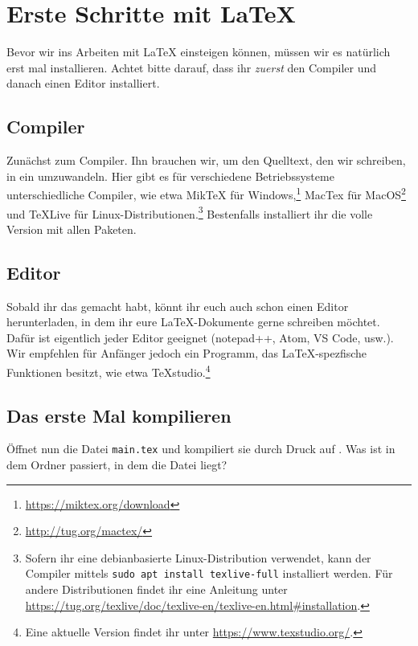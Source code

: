 \chapter*{Erste Schritte mit \LaTeX}
Bevor wir ins Arbeiten mit \LaTeX{} einsteigen können, müssen wir es natürlich erst mal installieren. Achtet bitte darauf, dass ihr \emph{zuerst} den Compiler und danach einen Editor installiert.

\section*{Compiler}
Zunächst zum Compiler. Ihn brauchen wir, um den Quelltext, den wir schreiben, in ein  umzuwandeln. Hier gibt es für verschiedene Betriebssysteme unterschiedliche Compiler, wie etwa MikTeX für Windows,\footnote{\url{https://miktex.org/download}} MacTex für MacOS\footnote{\url{http://tug.org/mactex/}} und TeXLive für Linux-Distributionen.\footnote{Sofern ihr eine debianbasierte Linux-Distribution verwendet, kann der Compiler mittels \texttt{sudo apt install texlive-full} installiert werden. Für andere Distributionen findet ihr eine Anleitung unter \url{https://tug.org/texlive/doc/texlive-en/texlive-en.html\#installation}.} Bestenfalls installiert ihr die volle Version mit allen Paketen.

\section*{Editor}
Sobald ihr das gemacht habt, könnt ihr euch auch schon einen Editor herunterladen, in dem ihr eure \LaTeX-Dokumente gerne schreiben möchtet. Dafür ist eigentlich jeder Editor geeignet (notepad++, Atom, VS Code, usw.). Wir empfehlen für Anfänger jedoch ein Programm, das \LaTeX-spezfische Funktionen besitzt, wie etwa TeXstudio.\footnote{Eine aktuelle Version findet ihr unter \url{https://www.texstudio.org/}.}

\section*{Das erste Mal kompilieren}
Öffnet nun die Datei \texttt{main.tex} und kompiliert sie durch Druck auf \faForward. Was ist in dem Ordner passiert, in dem die Datei liegt?
